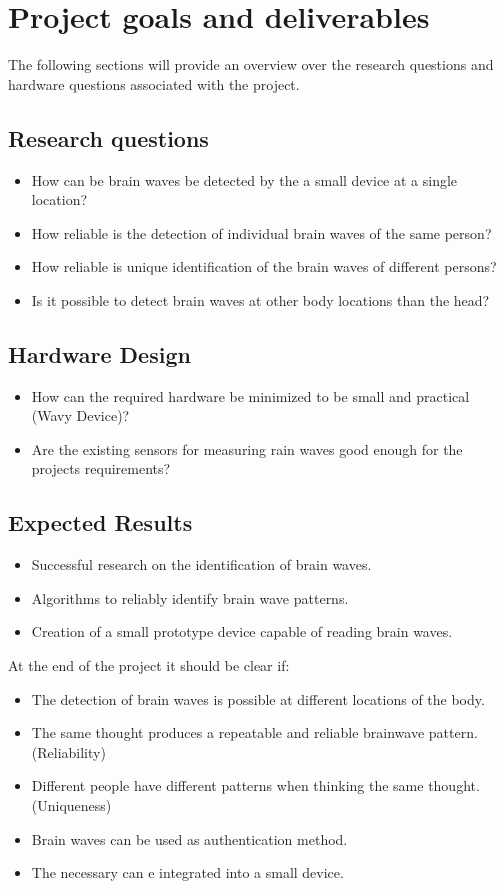 \section{Project goals and deliverables}
\label{sect:goals}
The following sections will provide an overview over the research questions and hardware questions associated with the project.
\subsection{Research questions}
\begin{itemize}
	\item How can be brain waves be detected by the a small device at a single location?
	\item How reliable is the detection of individual brain waves of the same person?
	\item How reliable is unique identification of the brain waves of different persons?
	\item Is it possible to detect brain waves at other body locations than the head?
\end{itemize}

\subsection{Hardware Design}
\begin{itemize}
	\item How can the required hardware be minimized to be small and practical (Wavy Device)?
	\item Are the existing sensors for measuring rain waves good enough for the projects requirements?
\end{itemize}

\subsection{Expected Results}
\begin{itemize}
	\item Successful research on the identification of brain waves.
	\item Algorithms to reliably identify brain wave patterns.
	\item Creation of a small prototype device capable of reading brain waves.
\end{itemize}

At the end of the project it should be clear if:
\begin{itemize}
	\item The detection of brain waves is possible at different locations of the body.
	\item The same thought produces a repeatable and reliable brainwave pattern. (Reliability)
	\item Different people have different patterns when thinking the same thought. (Uniqueness)
	\item Brain waves can be used as authentication method.
	\item The necessary can e integrated into a small device.
\end{itemize}

